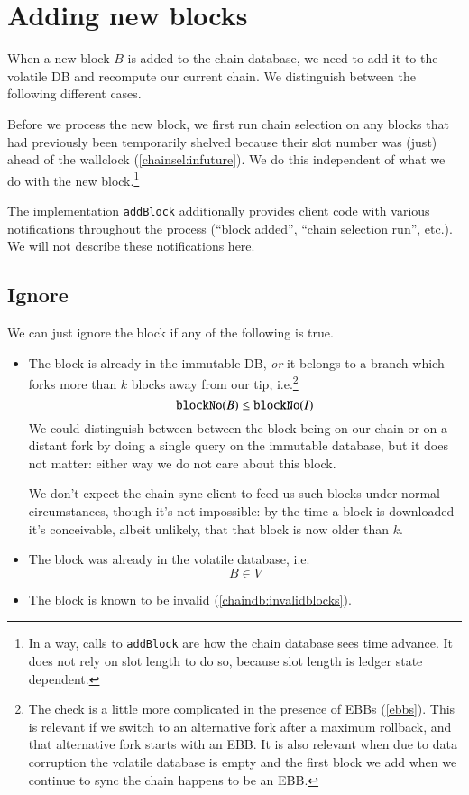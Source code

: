 \section{Adding new blocks}
\label{chainsel:addblock}

When a new block $B$ is added to the chain database, we need to add it to the
volatile DB and recompute our current chain. We distinguish between the
following different cases.

Before we process the new block, we first run chain selection on any blocks that
had previously been temporarily shelved because their slot number was (just)
ahead of the wallclock (\cref{chainsel:infuture}). We do this independent of what
we do with the new block.\footnote{In a way, calls to \lstinline!addBlock! are
how the chain database sees time advance. It does not rely on slot length to do
so, because slot length is ledger state dependent.}

The implementation \lstinline!addBlock! additionally provides  client code with
various notifications throughout the process  (``block added'', ``chain
selection run'', etc.). We will not describe these notifications here.

\subsection{Ignore}

We can just ignore the block if any of the following is true.

\begin{itemize}

\item
The block is already in the immutable DB, \emph{or} it belongs to a branch which
forks more than $k$ blocks away from our tip, i.e.\footnote{The check is a
little more complicated in the presence of EBBs (\cref{ebbs}). This is relevant
if we switch to an alternative fork after a maximum rollback, and that
alternative fork starts with an EBB. It is also relevant when due to data
corruption the volatile database is empty and the first block we add when we
continue to sync the chain happens to be an EBB.}
%
\begin{equation*}
\mathtt{blockNo}(B) \leq \mathtt{blockNo}(I)
\end{equation*}
%
We could distinguish between between the block being on our chain or on a
distant fork by doing a single query on the immutable database, but it does not
matter: either way we do not care about this block.

We don't expect the chain sync client to feed us such blocks under normal
circumstances, though it's not impossible: by the time a block is downloaded
it's conceivable, albeit unlikely, that that block is now older than $k$.

\item
The block was already in the volatile database, i.e.
%
\begin{equation*}
B \in V
\end{equation*}

\item
The block is known to be invalid (\cref{chaindb:invalidblocks}).

\end{itemize}

